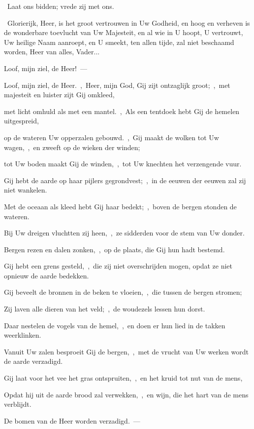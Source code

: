 \documentclass[12pt,twoside,a5paper]{article}
\begin{document}
\begin{halfparskip}
  \dd~Laat ons bidden; vrede zij met ons.

  \cc~Glorierijk, Heer, is het groot vertrouwen in Uw Godheid, en hoog en verheven is de wonderbare toevlucht van Uw Majesteit, en al wie in U hoopt, U vertrouwt, Uw heilige Naam aanroept, en U smeekt, ten allen tijde, zal niet beschaamd worden, Heer van alles, Vader...
\end{halfparskip}

\begin{halfparskip}
   Loof, mijn ziel, de Heer!~--- 

  Loof, mijn ziel, de Heer.~\sep\ Heer, mijn God, Gij zijt ontzaglijk groot;~\sep\ met majesteit en luister zijt Gij omkleed,

  met licht omhuld als met een mantel.~\sep\ Als een tentdoek hebt Gij de hemelen uitgespreid,

  op de wateren Uw opperzalen gebouwd.~\sep\ Gij maakt de wolken tot Uw wagen,~\sep\ en zweeft op de wieken der winden;

  tot Uw boden maakt Gij de winden,~\sep\ tot Uw knechten het verzengende vuur.

  Gij hebt de aarde op haar pijlers gegrondvest;~\sep\ in de eeuwen der eeuwen zal zij niet wankelen.

  Met de oceaan als kleed hebt Gij haar bedekt;~\sep\ boven de bergen stonden de wateren.

  Bij Uw dreigen vluchtten zij heen,~\sep\ ze sidderden voor de stem van Uw donder.

  Bergen rezen en dalen zonken,~\sep\ op de plaats, die Gij hun hadt bestemd.

  Gij hebt een grens gesteld,~\sep\ die zij niet overschrijden mogen, opdat ze niet opnieuw de aarde bedekken.

  Gij beveelt de bronnen in de beken te vloeien,~\sep\ die tussen de bergen stromen;

  Zij laven alle dieren van het veld;~\sep\ de woudezels lessen hun dorst.

  Daar nestelen de vogels van de hemel,~\sep\ en doen er hun lied in de takken weerklinken.

  Vanuit Uw zalen besproeit Gij de bergen,~\sep\ met de vrucht van Uw werken wordt de aarde verzadigd.

  Gij laat voor het vee het gras ontspruiten,~\sep\ en het kruid tot nut van de mens,

  Opdat hij uit de aarde brood zal verwekken,~\sep\ en wijn, die het hart van de mens verblijdt.

  De bomen van de Heer worden verzadigd.~---  
\end{halfparskip}
\end{document}
